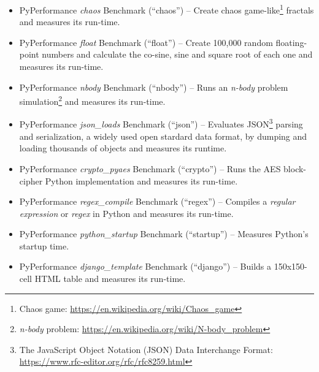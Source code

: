 \begin{itemize}
    \item PyPerformance \textit{chaos} Benchmark (``chaos'') -- Create chaos game-like\footnote{Chaos game: \url{https://en.wikipedia.org/wiki/Chaos_game}} fractals and measures its run-time.
    \item PyPerformance \textit{float} Benchmark (``float'') -- Create 100,000 random floating-point numbers and calculate the co-sine, sine and square root of each one and measures its run-time.
    \item PyPerformance \textit{nbody} Benchmark (``nbody'') -- Runs an \textit{n-body} problem simulation\footnote{\textit{n-body} problem: \url{https://en.wikipedia.org/wiki/N-body_problem}} and measures its run-time.
    \item PyPerformance \textit{json\_loads} Benchmark (``json'') -- Evaluates \acf{JSON}\footnote{The JavaScript Object Notation (JSON) Data Interchange Format: \url{https://www.rfc-editor.org/rfc/rfc8259.html}} parsing and serialization, a widely used open stardard data format, by dumping and loading thousands of objects and measures its runtime.
    \item PyPerformance \textit{crypto\_pyaes} Benchmark (``crypto'') -- Runs the AES block-cipher Python implementation and measures its run-time.
    \item PyPerformance \textit{regex\_compile} Benchmark (``regex'') -- Compiles a \textit{regular expression} or \textit{regex} in Python and measures its run-time.
    \item PyPerformance \textit{python\_startup} Benchmark (``startup'') -- Measures Python's startup time.
    \item PyPerformance \textit{django\_template} Benchmark (``django'') -- Builds a 150x150-cell HTML table and measures its run-time.
\end{itemize}

